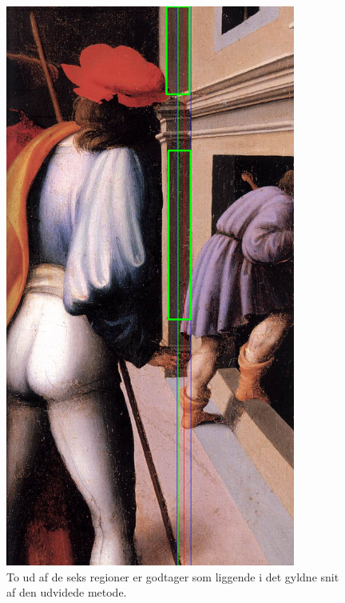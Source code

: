\begin{figure}[h!!]
	\begin{center}
		\includegraphics[width=0.85\textwidth,angle=0]{afsnit/afprovning/billeder/udvidet_losning/udvidet_kfarver_sdetaljer.png}
	\end{center}
	\caption[]{To ud af de seks regioner er godtager som liggende i det gyldne snit af den udvidede metode.}
	\label{udvidet_virker1}
\end{figure}

